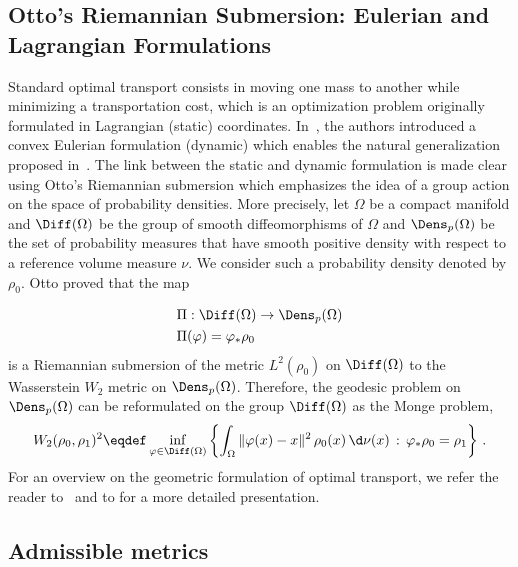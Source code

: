 \subsection{Otto's Riemannian Submersion: Eulerian and Lagrangian Formulations}\label{sec-submersion}


Standard optimal transport consists in moving one mass to another while minimizing a transportation cost, which is an optimization problem originally formulated in Lagrangian (static) coordinates. In~\cite{benamou2000computational}, the authors introduced a convex Eulerian formulation (dynamic) which enables the natural generalization proposed in~\cite{ChizatOTFR2015,new2015kondratyev}. The link between the static and dynamic formulation is made clear using Otto's Riemannian submersion \cite{OttoPorousMedium} which emphasizes the idea of a group action on the space of probability densities.
More precisely, let $\Omega$ be a compact manifold and $\Diff(\Omega)$ be the group of smooth diffeomorphisms of $\Omega$ and $\Dens_p(\Omega)$ be the set of probability measures that have smooth positive density with respect to a reference volume measure $\nu$. We consider such a probability density denoted by $\rho_0$. Otto proved that the map 

\begin{align*}& \Pi: \Diff(\Omega) \to \Dens_p(\Omega) \\
&\Pi(\varphi) = \varphi_* \rho_0
\end{align*} 
is a Riemannian submersion of the metric $L^2(\rho_0)$ on  $ \Diff(\Omega)$ to the Wasserstein $W_2$ metric on $\Dens_p(\Omega)$. Therefore, the geodesic problem on $\Dens_p(\Omega)$ can be reformulated on the group $\Diff(\Omega)$ as the Monge problem,
\begin{equation}
W_2(\rho_0, \rho_1)^2 \eqdef \inf_{\varphi \in \Diff(\Omega)} \left\{ \int_\Omega \| \varphi(x) - x\|^2  \, \rho_0(x) \, \d \nu(x) \, : \, \varphi_*\rho_0 = \rho_1 \right\}\,.
\end{equation}
For an overview on the geometric formulation of optimal transport, we refer the reader to~\cite{khesin2008geometry} and to \cite{DelanoeGeometryOT} for a more detailed presentation.

\subsection{Admissible metrics}\label{sec:AdmissibleMetrics}

